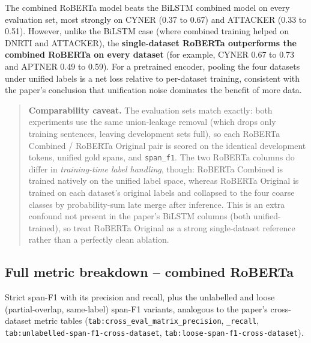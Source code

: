 The combined RoBERTa model beats the BiLSTM combined model on every evaluation set, most strongly on CYNER (0.37 to 0.67) and ATTACKER (0.33 to 0.51). However, unlike the BiLSTM case (where combined training helped on DNRTI and ATTACKER), the \textbf{single-dataset RoBERTa outperforms the combined RoBERTa on every dataset} (for example, CYNER 0.67 to 0.73 and APTNER 0.49 to 0.59). For a pretrained encoder, pooling the four datasets under unified labels is a net loss relative to per-dataset training, consistent with the paper's conclusion that unification noise dominates the benefit of more data.

\begin{quote}
\textbf{Comparability caveat.} The evaluation sets match exactly: both experiments use the same union-leakage removal (which drops only training sentences, leaving development sets full), so each RoBERTa Combined / RoBERTa Original pair is scored on the identical development tokens, unified gold spans, and \texttt{span\_f1}. The two RoBERTa columns do differ in \textit{training-time label handling}, though: RoBERTa Combined is trained natively on the unified label space, whereas RoBERTa Original is trained on each dataset's original labels and collapsed to the four coarse classes by probability-sum late merge after inference. This is an extra confound not present in the paper's BiLSTM columns (both unified-trained), so treat RoBERTa Original as a strong single-dataset reference rather than a perfectly clean ablation.
\end{quote}

\subsection*{Full metric breakdown -- combined RoBERTa}

Strict span-F1 with its precision and recall, plus the unlabelled and loose (partial-overlap, same-label) span-F1 variants, analogous to the paper's cross-dataset metric tables (\texttt{tab:cross\_eval\_matrix\_precision}, \texttt{\_recall}, \texttt{tab:unlabelled-span-f1-cross-dataset}, \texttt{tab:loose-span-f1-cross-dataset}).


\begin{table}[h!]
\centering
{}%
\caption{Full metric breakdown for the combined RoBERTa model.}
\label{tab:combined_roberta_metrics}
\end{table}

